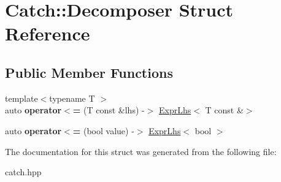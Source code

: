 \hypertarget{struct_catch_1_1_decomposer}{}\section{Catch\+:\+:Decomposer Struct Reference}
\label{struct_catch_1_1_decomposer}
\subsection*{Public Member Functions}
\begin{DoxyCompactItemize}
\item 
\mbox{\label{struct_catch_1_1_decomposer_a20b5b8c0e2ff0328a019ae1a8deca03a}} 
{\footnotesize template$<$typename T $>$ }\\auto {\bfseries operator$<$=} (T const \&lhs) -\/$>$ \mbox{\hyperlink{class_catch_1_1_expr_lhs}{Expr\+Lhs}}$<$ T const \&$>$
\item 
\mbox{\label{struct_catch_1_1_decomposer_aac129b94903ae1339d5709049d83613b}} 
auto {\bfseries operator$<$=} (bool value) -\/$>$ \mbox{\hyperlink{class_catch_1_1_expr_lhs}{Expr\+Lhs}}$<$ bool $>$
\end{DoxyCompactItemize}


The documentation for this struct was generated from the following file\+:\begin{DoxyCompactItemize}
\item 
catch.\+hpp\end{DoxyCompactItemize}
